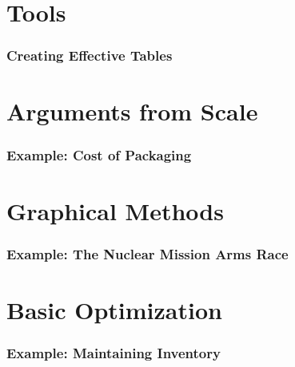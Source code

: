 \documentclass[compress,handout,10pt]{beamer}
\begin{document}
\section{Tools}
\begin{frame}
    \frametitle{Creating Effective Tables}
\end{frame}

\section{Arguments from Scale}

\begin{frame}
    \frametitle{Example: Cost of Packaging}
\end{frame}

\section{Graphical Methods}
\begin{frame}
    \frametitle{Example: The Nuclear Mission Arms Race}
\end{frame}

\section{Basic Optimization}
\begin{frame}
    \frametitle{Example: Maintaining Inventory}
\end{frame}

\begin{frame}

\nocite{*}
{}
\end{frame}
\end{document}
